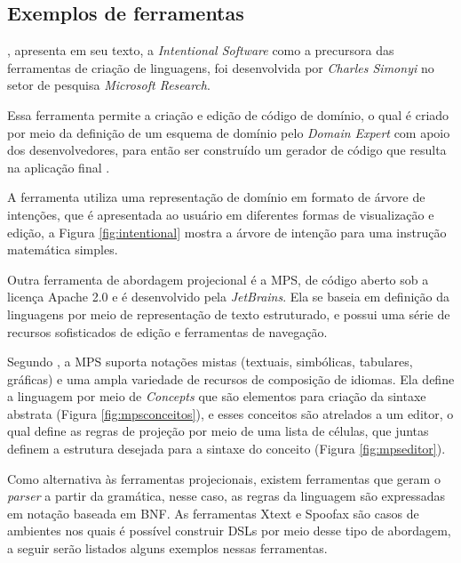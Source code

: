 \newpage
\subsection{Exemplos de ferramentas}
\label{exemplosferramentasdsl}

, apresenta em seu texto, a \textit{Intentional Software} como a precursora das ferramentas de criação de linguagens, foi desenvolvida por \textit{Charles Simonyi} no setor de pesquisa \textit{Microsoft Research}. 

Essa ferramenta permite a criação e edição de código de domínio, o qual é criado por meio da definição de um esquema de domínio pelo \textit{Domain Expert} com apoio dos desenvolvedores, para então ser construído um gerador de código que resulta na aplicação final \cite{simonyi2006intentional}. 

A ferramenta utiliza uma representação de domínio em formato de árvore de intenções, que é apresentada ao usuário em diferentes formas de visualização e edição, a Figura \ref{fig:intentional} mostra a árvore de intenção para uma instrução matemática simples.



Outra ferramenta de abordagem projecional é a \gls{MPS}, de código aberto sob a licença Apache 2.0 e é desenvolvido pela \textit{JetBrains}. Ela se baseia em definição da linguagens por meio de representação de texto estruturado, e possui uma série de recursos sofisticados de edição e ferramentas de navegação. 

Segundo , a \gls{MPS} suporta notações mistas (textuais, simbólicas, tabulares, gráficas) e uma ampla variedade de recursos de composição de idiomas. Ela define a linguagem por meio de \textit{Concepts} que são elementos para criação da sintaxe abstrata (Figura \ref{fig:mpsconceitos}), e esses conceitos são atrelados a um editor, o qual define as regras de projeção por meio de uma lista de células, que juntas definem a estrutura desejada para a sintaxe do conceito (Figura \ref{fig:mpseditor}).





\newpage


Como alternativa às ferramentas projecionais, existem ferramentas que geram o \textit{parser} a partir da gramática, nesse caso, as regras da linguagem são expressadas em notação baseada em \gls{BNF}. As ferramentas Xtext e Spoofax são casos de ambientes nos quais é possível construir \gls{DSL}s por meio desse tipo de abordagem, a seguir serão listados alguns exemplos nessas ferramentas.



